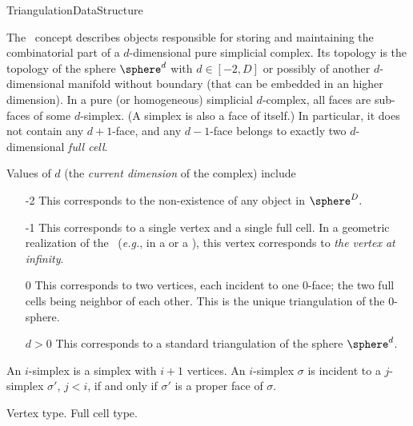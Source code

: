 \begin{ccRefConcept}{TriangulationDataStructure}

\ccDefinition

The \ccRefName\ concept describes objects responsible for storing and
maintaining the combinatorial part of a
$d$-dimensional pure simplicial complex. Its topology is the topology
of the sphere  $\sphere^d$ with $d\in[-2,D]$
or possibly of another $d$-dimensional manifold without boundary 
(that can be embedded in an higher dimension).
 In a  pure (or homogeneous) simplicial $d$-complex, all
 faces are sub-faces of some $d$-simplex. (A
simplex is also a face of itself.) In particular, it does not
contain any $d+1$-face, and any $d-1$-face belongs to exactly
two $d$-dimensional {\em full cell}. 

Values of $d$ (the \emph{current dimension} of the complex) include \begin{itemize}

\item[-2] This corresponds to the non-existence of any object in
$\sphere^D.$

\item[-1] This corresponds to a single vertex and a single full cell. In a
geometric realization of the \ccRefName\ (\emph{e.g.}, in a
 or a
), this vertex
corresponds to \emph{the vertex at infinity}.

\item[0] This corresponds to two vertices, each incident to one $0$-face;
the two full cells being neighbor of each other. This is the unique
triangulation of the $0$-sphere.

\item[$d>0$] This corresponds to a standard triangulation of the sphere
$\sphere^d$.
\end{itemize}

An $i$-simplex is a simplex with $i+1$ vertices. An $i$-simplex $\sigma$ is
{incident} to a $j$-simplex $\sigma'$, $j<i$, if and only if $\sigma'$
is a proper face of $\sigma$. 

\ccHasModels


\ccTypes

{
Vertex type.
}
\ccGlue
{}
{
Full cell type.
}


\end{ccRefConcept}
